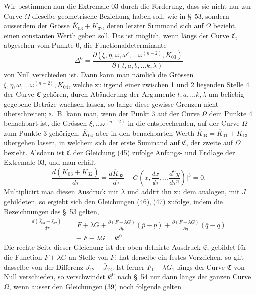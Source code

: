 \documentclass[11pt,a4paper,leqno]{article}
\begin{document}
Wir bestimmen nun die Extremale 03 durch die Forderung, dass sie nicht nur zur Curve $\Omega$ dieselbe geometrische Beziehung haben soll, wie in \S~53, sondern ausserdem der Grösse $\overline{K}_{03}+K_{32}$, deren letzter Summand sich auf $\Omega$ bezieht, einen constanten Werth geben soll. Das ist möglich, wenn längs der Curve $\mathfrak{C}$, abgesehen vom Punkte 0, die Functionaldeterminante
\[
\Delta^0=
\frac{\partial(\xi,\eta,\omega,\omega',\ldots\omega^{(n-2)},\overline{K}_{03})}
{\partial(t,a,b,\ldots k,\lambda)}
\]
von Null verschieden ist. Dann kann man nämlich die Grössen $\xi,\eta,\omega,\ldots\omega^{(n-2)},\overline{K}_{04}$, welche zu irgend einer zwischen 1 und 2 liegenden Stelle 4 der Curve $\mathfrak{C}$ gehören, durch Abänderung der Argumente $t,a,\ldots k,\lambda$ um beliebig gegebene Beträge wachsen lassen, so lange diese gewisse Grenzen nicht überschreiten; z.~B. kann man, wenn der Punkt 3 auf der Curve $\Omega$ dem Punkte 4 benachbart ist, die Grössen $\xi,\ldots\omega^{(n-2)}$ in die entsprechenden, auf der Curve $\Omega$ zum Punkte 3 gehörigen, $\overline{K}_{04}$ aber in den benachbarten Werth $\overline{K}_{03}=\overline{K}_{01}+K_{13}$ übergehen lassen, in welchem sich der erste Summand auf $\mathfrak{C}$, der zweite auf $\Omega$ bezieht. Alsdann ist $\mathfrak{C}$ der Gleichung (45) zufolge Anfangs- und Endlage der Extremale 03, und man erhält
\begin{equation}\tag{48}
\frac{d(\overline{K}_{03}+K_{32})}{d\tau}
=\frac{d\overline{K}_{03}}{d\tau}
-G\left(x,\frac{dx}{d\tau},\ldots\frac{d^ny}{d\tau^n}\right)\bigg|^3=0.
\end{equation}
Multiplicirt man diesen Ausdruck mit $\lambda$ und addirt ihn zu dem analogen, mit $J$ gebildeten, so ergiebt sich den Gleichungen (46), (47) zufolge, indem die Bezeichnungen des \S~53 gelten,
\[
\begin{aligned}
\frac{d(\overline{J}_{03}+J_{32})}{d\tau}
&=F+\lambda G
+\frac{\partial(F+\lambda G)}{\partial p}(\overline{p}-p)
+\frac{\partial(F+\lambda G)}{\partial q}(\overline{q}-q)\\
&\quad-\overline{F}-\lambda\overline{G}
=\mathfrak{E}^0.
\end{aligned}
\]
Die rechte Seite dieser Gleichung ist der oben definirte Ausdruck $\mathfrak{E}$, gebildet für die Function $F+\lambda G$ an Stelle von $F$; hat derselbe ein festes Vorzeichen, so gilt dasselbe von der Differenz $J_{12}-\overline{J}_{12}$. Ist ferner $F_1+\lambda G_1$ längs der Curve $\mathfrak{C}$ von Null verschieden, so verschwindet $\mathfrak{E}^0$ nach \S~54 nur dann längs der ganzen Curve $\Omega$, wenn ausser den Gleichungen (39) noch folgende gelten
\end{document}
